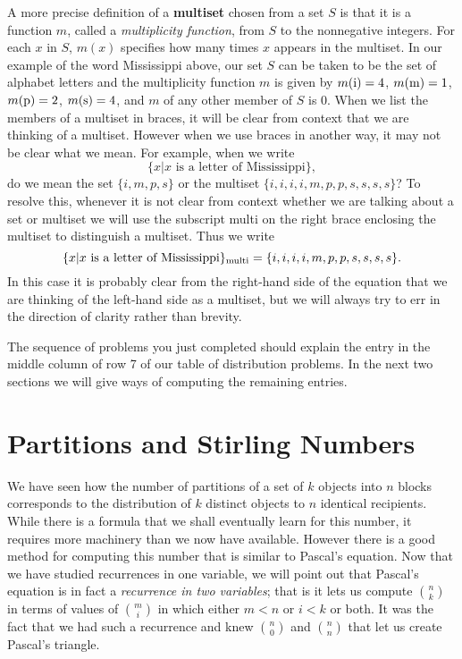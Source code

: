 A more precise definition of a {\bf multiset} chosen from
a set
$S$ is that it is a function $m$, called a {\em multiplicity
function}, from
$S$ to the nonnegative integers.  For each $x$ in $S$, $m(x)$ specifies
how many times $x$ appears in the multiset.  In our example of the word
Mississippi above, our set $S$ can be taken to be the set of alphabet
letters and the multiplicity function $m$ is given by $m({\rm i})=4$,
$m({\rm m}) =1$, $m({\rm p})=2$, $m({\rm s}) =4$, and $m$ of any other
member of $S$ is 0.  When we list the members of a multiset in braces, it
will be clear from context that we are thinking of a multiset.  However
when we use braces in another way, it may not be clear what we mean.  For
example, when we write
$$\{x|x \mbox{~is a letter of Mississippi}\},$$
do we mean the set $\{i,m,p,s\}$ or the multiset
$\{i,i,i,i,m,p,p,s,s,s,s\}$?  To resolve this, whenever it is not clear
from context whether we are talking about a set or multiset we will use
the subscript multi on the right brace enclosing the multiset to
distinguish a multiset. Thus we write
$$\{x|x \mbox{\ is a letter of
Mississippi}\}_{\mbox{\scriptsize multi}}=\{i,i,i,i,m,p,p,s,s,s,s\}.$$
In this case it is probably clear from the right-hand side of the equation
that we are thinking of the left-hand side as a multiset, but we will
always try to err in the direction of clarity rather than brevity.

The
sequence of problems you just completed should explain the entry in the
middle column  of row 7 of our table of distribution problems.  In the
next two sections we will give ways of computing the remaining entries.


\section{Partitions and Stirling Numbers} We have seen how the number of
partitions of a set of $k$ objects into $n$ blocks corresponds to the
distribution of $k$ distinct objects to $n$ identical recipients.  While
there is a formula that we shall eventually learn for this number, it
requires more machinery than we now have available.  However there is a
good method for computing this number that is similar to Pascal's
equation.  Now that we have studied recurrences in one variable, we will
point out that Pascal's equation is in fact a {\em recurrence in two
variables}; that is it lets us compute $n\choose k$ in terms of values of
$m\choose i$ in which either $m<n$ or $i<k$ or both.  It was the fact
that we had such a recurrence and knew $n\choose 0$ and $n\choose n$ that
let us create Pascal's triangle.
